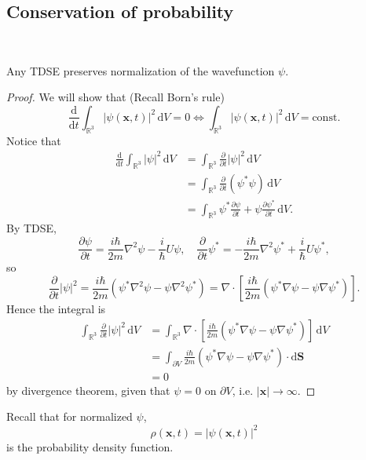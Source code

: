 \documentclass[a4paper]{article}
\begin{document}
\subsection{Conservation of probability}\
\vspace{-1.5em}
\begin{proposition}
    Any TDSE preserves normalization of the wavefunction $\psi$. 
\end{proposition}
\begin{proof}
    We will show that (Recall Born's rule)
    \[
        \frac{\mathrm{d}}{\mathrm{d}t} \int_{\mathbb{R}^3} | \psi(\mathbf{x},t)|^2 \,\mathrm{d}V = 0 \iff \int_{\mathbb{R}^3} | \psi(\mathbf{x},t)|^2 \,\mathrm{d}V = \text{const}.
    \]
    Notice that 
    \begin{align*}
        \frac{\mathrm{d}}{\mathrm{d}t} \int_{\mathbb{R}^3} | \psi|^2 \,\mathrm{d}V &= \int_{ \mathbb{R}^{3}} \frac{\partial }{\partial t}|\psi|^2  \,\mathrm{d}V\\ 
        &=\int_{\mathbb{R}^3} \frac{\partial }{\partial t}(\psi^* \psi)  \,\mathrm{d}V\\ 
        &= \int_{\mathbb{R}^3} \psi^* \frac{\partial \psi}{\partial t} + \psi\frac{\partial \psi^*}{\partial t}   \,\mathrm{d}V. 
    \end{align*}
    By TDSE, 
    \[
        \frac{\partial \psi}{\partial t} = \frac{i\hbar}{2m}\nabla^2 \psi - \frac{i}{\hbar} U \psi,\quad \frac{\partial}{\partial t} \psi^*=-\frac{i \hbar}{2 m} \nabla^2 \psi^*+\frac{i}{\hbar} U \psi^*,
    \]
    so 
    \[
        \frac{\partial}{\partial t}|\psi|^2=\frac{i \hbar}{2 m}\left(\psi^* \nabla^2 \psi-\psi \nabla^2 \psi^*\right)=\nabla \cdot\left[\frac{i \hbar}{2 m}\left(\psi^* \nabla \psi-\psi \nabla \psi^*\right)\right]. 
    \]
    Hence the integral is 
    \begin{align*}
        \int_{ \mathbb{R}^{3}} \frac{\partial }{\partial t}|\psi|^2  \,\mathrm{d}V &= \int_{\mathbb{R}^3} \nabla \cdot\left[\frac{i \hbar}{2 m}\left(\psi^* \nabla \psi-\psi \nabla \psi^*\right)\right] \,\mathrm{d}V\\ 
        &= \int_{\partial V} \frac{i \hbar}{2 m}\left(\psi^* \nabla \psi-\psi \nabla \psi^*\right) \cdot \mathrm{d} \mathbf{S}\\ 
        &= 0 
    \end{align*}
    by divergence theorem, given that $ \psi = 0 $ on $ \partial V $, i.e. $ |\mathbf{x}|\to \infty  $. 
\end{proof}

Recall that for normalized $ \psi $,
\[
    \rho(\mathbf{x},t) = | \psi(\mathbf{x},t)|^2
\]
is the probability density function. 
\end{document}
